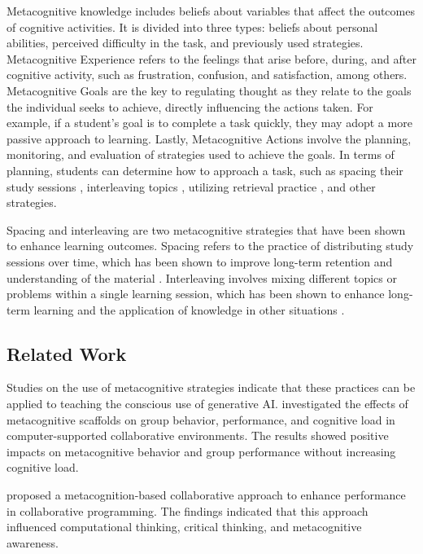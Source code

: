 \documentclass[a4paper,twoside]{article}
\begin{document}
Metacognitive knowledge includes beliefs about variables that affect the
outcomes of cognitive activities. It is divided into three types: beliefs about
personal abilities, perceived difficulty in the task, and previously used
strategies. Metacognitive Experience refers to the feelings that arise
before, during, and after cognitive activity, such as frustration, confusion,
and satisfaction, among others. Metacognitive Goals are the key to regulating
thought as they relate to the goals the individual seeks to achieve, directly
influencing the actions taken. For example, if a student’s goal is to complete
a task quickly, they may adopt a more passive approach to learning. Lastly,
Metacognitive Actions involve the planning, monitoring, and evaluation of
strategies used to achieve the goals. In terms of planning, students can
determine how to approach a task, such as spacing their study sessions
\citep{Ouhao18, Carvalho20}, interleaving topics \citep{Rivers21}, utilizing
retrieval practice \citep{larsen18}, and other strategies.

Spacing and interleaving are two metacognitive strategies that have been shown to
enhance learning outcomes. Spacing refers to the practice of distributing study
sessions over time, which has been shown to improve long-term retention and
understanding of the material \citep{Carvalho20}. Interleaving involves mixing
different topics or problems within a single learning session, which has been
shown to enhance long-term learning and the application of knowledge in other
situations \citep{Rivers21}.

\subsection{Related Work}

Studies on the use of metacognitive strategies indicate that these practices can
be applied to teaching the conscious use of generative AI. \cite{Zheng19}
investigated the effects of metacognitive scaffolds on group behavior,
performance, and cognitive load in computer-supported collaborative
environments. The results showed positive impacts on metacognitive
behavior and group performance without increasing cognitive load.

\cite{LiWei23} proposed a metacognition-based collaborative approach to enhance
performance in collaborative programming. The findings indicated that this
approach influenced computational thinking, critical thinking, and
metacognitive awareness.
\end{document}
